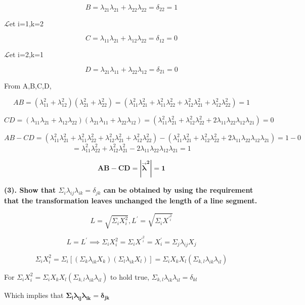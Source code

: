 \documentclass[12pt]{article}
\begin{document}
$$
B = \lambda_{21}\lambda_{21} + \lambda_{22}\lambda_{22} = \delta_{22} = 1
$$

$\mathscr{L}$et i=1,k=2

$$
C = \lambda_{11}\lambda_{21} + \lambda_{12}\lambda_{22} = \delta_{12} = 0 
$$

$\mathscr{L}$et i=2,k=1

$$
D = \lambda_{21}\lambda_{11} + \lambda_{22}\lambda_{12} = \delta_{21} = 0
$$

From A,B,C,D,

$$
AB = (\lambda_{11}^2 + \lambda_{12}^2)(\lambda_{21}^2 + \lambda_{22}^2) = (\lambda_{11}^2\lambda_{21}^2 + \lambda_{11}^2\lambda_{22}^2 + \lambda_{12}^2\lambda_{21}^2 + \lambda_{12}^2\lambda_{22}^2) = 1
$$

$$
CD = (\lambda_{11}\lambda_{21} + \lambda_{12}\lambda_{22})(\lambda_{21}\lambda_{11} + \lambda_{22}\lambda_{12}) = (\lambda_{11}^2\lambda_{21}^2 + \lambda_{12}^2\lambda_{22}^2 + 2\lambda_{11}\lambda_{22}\lambda_{12}\lambda_{21}) = 0 
$$

$$
AB - CD = (\lambda_{11}^2\lambda_{21}^2 + \lambda_{11}^2\lambda_{22}^2 + \lambda_{12}^2\lambda_{21}^2 + \lambda_{12}^2\lambda_{22}^2) - (\lambda_{11}^2\lambda_{21}^2 + \lambda_{12}^2\lambda_{22}^2 + 2\lambda_{11}\lambda_{22}\lambda_{12}\lambda_{21}) = 1 - 0
$$
$$
= \lambda_{11}^2\lambda_{22}^2 + \lambda_{12}^2\lambda_{21}^2 - 2\lambda_{11}\lambda_{22}\lambda_{12}\lambda_{21} = 1
$$

$$\mathbf{AB - CD = |\vec{\lambda}^2| = 1}$$


\newpage
\textbf{(3). Show that $\Sigma_i \lambda_{ij}\lambda_{ik} = \delta_{jk}$ can be obtained by using the requirement that the transformation leaves unchanged the length of a line segment.}

$$
L = \sqrt{\Sigma_i X^2_i}, L^{\prime} = \sqrt{\Sigma_i X^{\prime}^2_i} 
$$

$$
L = L^{\prime} \implies \Sigma_i X^2_i = \Sigma_i X^{\prime}^2_i = X^{\prime}_i = \Sigma_j \lambda_{ij} X_j
$$

$$
\Sigma_i X^2_i = \Sigma_i [(\Sigma_k \lambda_{ik}X_k)(\Sigma_l \lambda_{ik} X_l)] = \Sigma_i X_k X_l (\Sigma_{k,l} \lambda_{ik}\lambda_{il})
$$

\hfill \break

For $\Sigma_i X^2_i = \Sigma_i X_k X_l (\Sigma_{k,l} \lambda_{ik}\lambda_{il})$ to hold true, $\Sigma_{k,l} \lambda_{ik}\lambda_{il} = \delta_{kl}$ 

\hfill \break

Which implies that $\boldsymbol{\Sigma_i \lambda_{ij}\lambda_{ik} = \delta_{jk}}$
\end{document}
